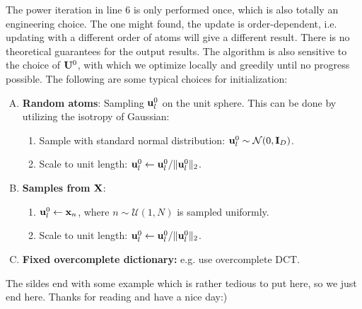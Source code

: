 \documentclass[../book-template.tex]{subfiles}
\begin{document}
The power iteration in line 6 is only performed once, which is also totally an engineering choice. The one might found, the update is order-dependent, i.e. updating with a different order of atoms will give a different result. There is no theoretical guarantees for the output results. The algorithm is also sensitive to the choice of ${\bf U}^0$, with which we optimize locally and greedily until no progress possible. The following are some typical choices for initialization:
\begin{enumerate}[A)]
	\item \textbf{Random atoms}: Sampling ${\bf u}_l^0$ on the unit sphere. This can be done by utilizing the isotropy of Gaussian:
	\begin{enumerate}[1.]
		\item Sample with standard normal distribution: ${\bf u}_l^0\sim \mathcal{N}(0,{\bf I}_D)$.
		\item Scale to unit length: ${\bf u}_l^0\leftarrow {\bf u}_l^0/\|{\bf u}_l^0\|_2$.
	\end{enumerate}
	\item \textbf{Samples from} ${\bf X}$:
	\begin{enumerate}[1.]
		\item ${\bf u}_l^0\leftarrow {\bf x}_n$, where $n\sim \mathcal{U}(1,N)$ is sampled uniformly.
		\item Scale to unit length: ${\bf u}_l^0\leftarrow {\bf u}_l^0/\|{\bf u}_l^0\|_2$.
	\end{enumerate}
	\item \textbf{Fixed overcomplete dictionary:} e.g. use overcomplete DCT.
\end{enumerate}
\par The sildes end with some example which is rather tedious to put here, so we just end here. Thanks for reading and have a nice day:)
\end{document}
